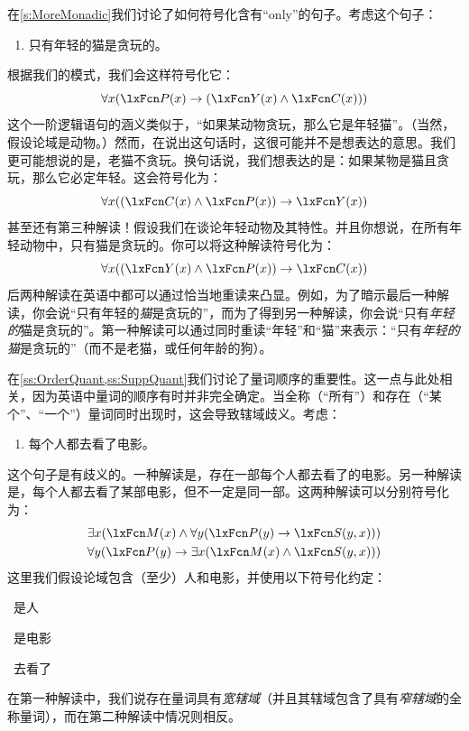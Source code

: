 在\cref{s:MoreMonadic}我们讨论了如何符号化含有“only”的句子。考虑这个句子：
\begin{enumerate}
	\item\label{onlyamb} 只有年轻的猫是贪玩的。
\end{enumerate}
根据我们的模式，我们会这样符号化它：
\[
	\forall x(\atom{P}{x} \eif (\atom{Y}{x} \eand \atom{C}{x}))
\]
这个一阶逻辑语句的涵义类似于，“如果某动物贪玩，那么它是年轻猫”。（当然，假设论域是动物。）然而，在说出这句话时，这很可能并不是想表达的意思。我们更可能想说的是，老猫不贪玩。换句话说，我们想表达的是：如果某物是猫且贪玩，那么它必定年轻。这会符号化为：
\[
	\forall x((\atom{C}{x} \eand \atom{P}{x}) \eif \atom{Y}{x})
\]
甚至还有第三种解读！假设我们在谈论年轻动物及其特性。并且你想说，在所有年轻动物中，只有猫是贪玩的。你可以将这种解读符号化为：
\[
	\forall x((\atom{Y}{x} \eand \atom{P}{x}) \eif \atom{C}{x})
\]
后两种解读在英语中都可以通过恰当地重读来凸显。例如，为了暗示最后一种解读，你会说“只有年轻的\emph{猫}是贪玩的”，而为了得到另一种解读，你会说“只有\emph{年轻的}猫是贪玩的”。第一种解读可以通过同时重读“年轻”和“猫”来表示：“只有\emph{年轻的猫}是贪玩的”（而不是老猫，或任何年龄的狗）。

在\cref{ss:OrderQuant,ss:SuppQuant}我们讨论了量词顺序的重要性。这一点与此处相关，因为英语中量词的顺序有时并非完全确定。当全称（“所有”）和存在（“某个”、“一个”）量词同时出现时，这会导致辖域歧义。考虑：
\begin{enumerate}
	\item\label{everya} 每个人都去看了电影。
\end{enumerate}
这个句子是有歧义的。一种解读是，存在一部每个人都去看了的电影。另一种解读是，每个人都去看了某部电影，但不一定是同一部。这两种解读可以分别符号化为：
\begin{align*}
	& \exists x(\atom{M}{x} \eand \forall y(\atom{P}{y} \eif \atom{S}{y,x}))\\
	& \forall y(\atom{P}{y} \eif \exists x(\atom{M}{x} \eand \atom{S}{y,x}))
\end{align*}
这里我们假设论域包含（至少）人和电影，并使用以下符号化约定：
\begin{ekey}
	\item[\atom{P}{y}] ~是人
	\item[\atom{M}{x}] ~是电影
	\item[\atom{S}{y,x}] ~去看了~
\end{ekey}
在第一种解读中，我们说存在量词具有\emph{宽辖域}（并且其辖域包含了具有\emph{窄辖域}的全称量词），而在第二种解读中情况则相反。

